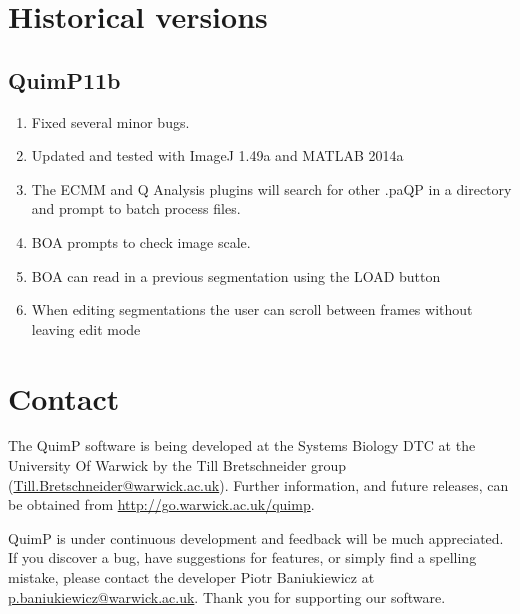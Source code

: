 \documentclass[a4paper,12pt]{article}
\begin{document}
\section {Historical versions}

\subsection{QuimP11b}

\begin{enumerate}
	\item Fixed several minor bugs.
	\item Updated and tested with ImageJ 1.49a and MATLAB 2014a
	\item The ECMM and Q Analysis plugins will search for other .paQP in a directory and prompt to batch process files.
	\item BOA prompts to check image scale.
	\item BOA can read in a previous segmentation using the LOAD button
	\item When editing segmentations the user can scroll between frames without leaving edit mode
\end{enumerate}

\section{Contact}

The QuimP software is being developed at the Systems Biology DTC at the University Of Warwick by the Till Bretschneider group (\href{mailto:till.bretschneider@warwick.ac.uk}{Till.Bretschneider@warwick.ac.uk}).
Further information, and future releases, can be obtained from \url{http://go.warwick.ac.uk/quimp}.

QuimP is under continuous development and feedback will be much appreciated.  If you discover a bug, have suggestions 
for features, or simply find a spelling mistake, please contact the developer Piotr Baniukiewicz at \href{mailto:p.baniukiewicz@warwick.ac.uk}{p.baniukiewicz@warwick.ac.uk}. Thank you for supporting our software. 

 
\end{document}
